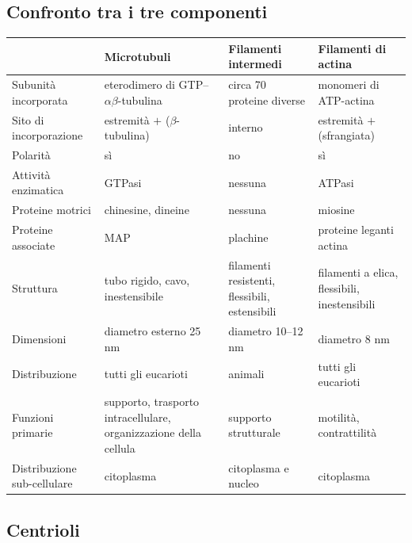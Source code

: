 \subsection{Confronto tra i tre componenti}

\begin{table}[htbp]
  \centering \footnotesize \renewcommand{\arraystretch}{1.25}
  \begin{tabularx}{\textwidth}{|l|>{\raggedright\arraybackslash}X|>{\raggedright\arraybackslash}X|>{\raggedright\arraybackslash}X|}
    \hline
     & \textbf{Microtubuli} & \textbf{Filamenti intermedi} & \textbf{Filamenti di actina} \\
    \hline
    Subunità incorporata & eterodimero di GTP--$\alpha\beta$-tubulina & circa 70 proteine diverse & monomeri di ATP-actina \\ \hline
    Sito di incorporazione & estremità $+$ ($\beta$-tubulina) & interno & estremità $+$ (sfrangiata) \\ \hline
    Polarità & sì & no & sì \\ \hline
    Attività enzimatica & GTPasi & nessuna & ATPasi \\ \hline
    Proteine motrici & chinesine, dineine & nessuna & miosine \\ \hline
    Proteine associate & MAP & plachine & proteine leganti actina \\ \hline
    Struttura & tubo rigido, cavo, inestensibile & filamenti resistenti, flessibili, estensibili & filamenti a elica, flessibili, inestensibili \\ \hline
    Dimensioni & diametro esterno 25 nm & diametro 10--12 nm & diametro 8 nm \\ \hline
    Distribuzione & tutti gli eucarioti & animali & tutti gli eucarioti \\ \hline
    Funzioni primarie & supporto, trasporto intracellulare, organizzazione della cellula & supporto strutturale & motilità, contrattilità \\ \hline
    Distribuzione sub-cellulare & citoplasma & citoplasma e nucleo & citoplasma \\ \hline
  \end{tabularx}
\end{table}

\subsection{Centrioli}

